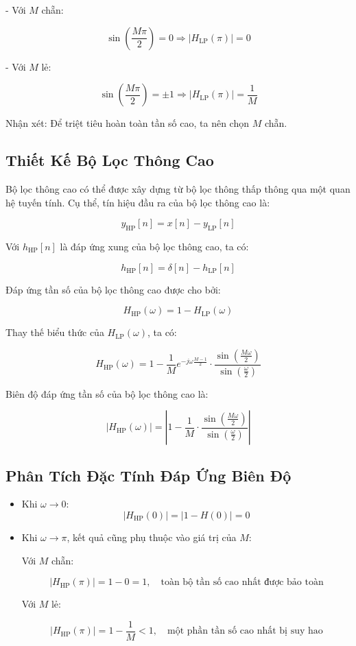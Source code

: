 - Với \( M \) chẵn:

\[
\sin\left(\frac{M\pi}{2}\right) = 0 \Rightarrow |H_{\mathrm{LP}}(\pi)| = 0
\]

- Với \( M \) lẻ:

\[
\sin\left(\frac{M\pi}{2}\right) = \pm 1 \Rightarrow |H_{\mathrm{LP}}(\pi)| = \frac{1}{M}
\]

Nhận xét: Để triệt tiêu hoàn toàn tần số cao, ta nên chọn \( M \) chẵn.

\subsection*{Thiết Kế Bộ Lọc Thông Cao}

Bộ lọc thông cao có thể được xây dựng từ bộ lọc thông thấp thông qua một quan hệ tuyến tính. Cụ thể, tín hiệu đầu ra của bộ lọc thông cao là:

\[
y_{\mathrm{HP}}[n] = x[n] - y_{\mathrm{LP}}[n]
\]

Với \( h_{\mathrm{HP}}[n] \) là đáp ứng xung của bộ lọc thông cao, ta có:

\[
h_{\mathrm{HP}}[n] = \delta[n] - h_{\mathrm{LP}}[n]
\]

Đáp ứng tần số của bộ lọc thông cao được cho bởi:

\[
H_{\mathrm{HP}}(\omega) = 1 - H_{\mathrm{LP}}(\omega)
\]

Thay thế biểu thức của \( H_{\mathrm{LP}}(\omega) \), ta có:

\[
H_{\mathrm{HP}}(\omega) = 1 - \frac{1}{M} e^{-j \omega \frac{M-1}{2}} \cdot \frac{\sin\left(\frac{M \omega}{2}\right)}{\sin\left(\frac{\omega}{2}\right)}
\]

Biên độ đáp ứng tần số của bộ lọc thông cao là:

\[
|H_{\mathrm{HP}}(\omega)| = \left| 1 - \frac{1}{M} \cdot \frac{\sin\left( \frac{M \omega}{2} \right)}{\sin\left( \frac{\omega}{2} \right)} \right|
\]

\subsection*{Phân Tích Đặc Tính Đáp Ứng Biên Độ}

\begin{itemize}
	\item Khi \( \omega \to 0 \):
	\[
	|H_{\mathrm{HP}}(0)| = |1 - H(0)| = 0
	\]
	
	\item Khi \( \omega \to \pi \), kết quả cũng phụ thuộc vào giá trị của \( M \):
	
	Với \( M \) chẵn:
	
	\[
	|H_{\mathrm{HP}}(\pi)| = 1 - 0 = 1, \quad \text{toàn bộ tần số cao nhất được bảo toàn}
	\]
	
	Với \( M \) lẻ:
	
	\[
	|H_{\mathrm{HP}}(\pi)| = 1 - \frac{1}{M} < 1, \quad \text{một phần tần số cao nhất bị suy hao}
	\]
\end{itemize}



